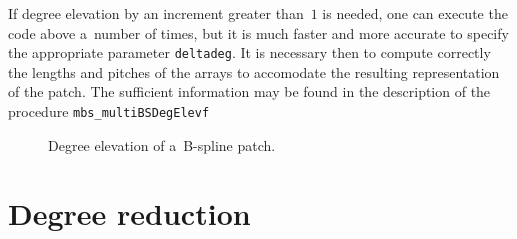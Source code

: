 \vspace{\medskipamount}
\vspace{\medskipamount}

If degree elevation by an increment greater than~$1$ is needed, one can
execute the code above a~number of times, but it is much faster and
more accurate to specify the appropriate parameter \texttt{deltadeg}.
It is necessary then to compute correctly the lengths and pitches
of the arrays to accomodate the resulting representation of the patch.
The sufficient information may be found in the description of the
procedure \texttt{mbs\_multiBSDegElevf}%
\begin{figure}[ht]
  \centerline{}
  \caption{Degree elevation of a~B-spline patch.}
\end{figure}


\newpage
\section{Degree reduction}

